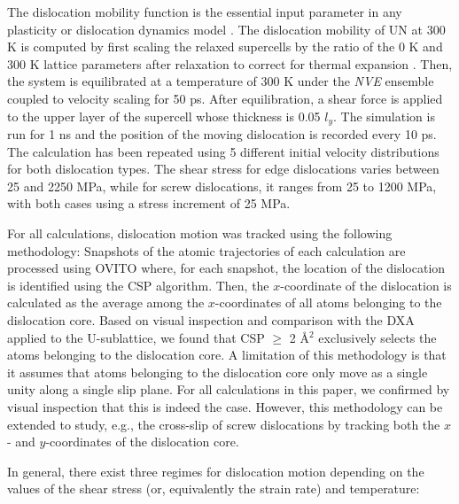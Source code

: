 \documentclass[applsci,article,submit,pdftex,moreauthors]{Definitions/mdpi}
\newcommand{\?}{\stackrel{?}{=}}
\begin{document}
The dislocation mobility function is the essential input parameter in any plasticity or dislocation dynamics model \cite{Kaloni2023}. The dislocation mobility of UN at 300 K is computed by first scaling the relaxed supercells by the ratio of the 0 K and 300 K lattice parameters after relaxation to correct for thermal expansion \cite{Cho2017}. Then, the system is equilibrated at a temperature of 300 K under the \textit{NVE} ensemble coupled to velocity scaling for 50 ps. After equilibration, a shear force is applied to the upper layer of the supercell whose thickness is 0.05 $l_y$. The simulation is run for 1 ns and the position of the moving dislocation is recorded every 10 ps. The calculation has been repeated using 5 different initial velocity distributions for both dislocation types. The shear stress for edge dislocations varies between 25 and 2250 MPa, while for screw dislocations, it ranges from 25 to 1200 MPa, with both cases using a stress increment of 25 MPa.

For all calculations, dislocation motion was tracked using the following methodology: Snapshots of the atomic trajectories of each calculation are processed using OVITO where, for each snapshot, the location of the dislocation is identified using the CSP algorithm. Then, the $x$-coordinate of the dislocation is calculated as the average among the $x$-coordinates of all atoms belonging to the dislocation core. Based on visual inspection and comparison with the DXA applied to the U-sublattice, we found that CSP $\geq$ 2 \AA$^2$ exclusively selects the atoms belonging to the dislocation core. A limitation of this methodology is that it assumes that atoms belonging to the dislocation core only move as a single unity along a single slip plane. For all calculations in this paper, we confirmed by visual inspection that this is indeed the case. However, this methodology can be extended to study, e.g., the cross-slip of screw dislocations by tracking both the $x$- and $y$-coordinates of the dislocation core.

In general, there exist three regimes for dislocation motion depending on the values of the shear stress (or, equivalently the strain rate) and temperature:
\end{document}
